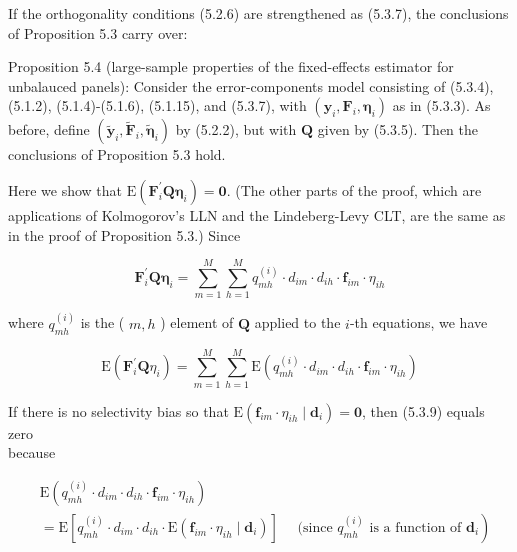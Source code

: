 \documentclass[10pt]{article}
\begin{document}
If the orthogonality conditions (5.2.6) are strengthened as (5.3.7), the conclusions of Proposition 5.3 carry over:

Proposition 5.4 (large-sample properties of the fixed-effects estimator for unbalauced panels): Consider the error-components model consisting of (5.3.4), (5.1.2), (5.1.4)-(5.1.6), (5.1.15), and (5.3.7), with $\left(\mathbf{y}_{i}, \mathbf{F}_{i}, \boldsymbol{\eta}_{i}\right)$ as in (5.3.3). As before, define $\left(\tilde{\mathbf{y}}_{i}, \tilde{\mathbf{F}}_{i}, \tilde{\boldsymbol{\eta}}_{i}\right)$ by (5.2.2), but with $\mathbf{Q}$ given by (5.3.5). Then the conclusions of Proposition 5.3 hold.

Here we show that $\mathrm{E}\left(\mathbf{F}_{i}^{\prime} \mathbf{Q} \boldsymbol{\eta}_{i}\right)=\mathbf{0}$. (The other parts of the proof, which are applications of Kolmogorov's LLN and the Lindeberg-Levy CLT, are the same as in the proof of Proposition 5.3.) Since


\begin{equation*}
\mathbf{F}_{i}^{\prime} \mathbf{Q} \boldsymbol{\eta}_{i}=\sum_{m=1}^{M} \sum_{h=1}^{M} q_{m h}^{(i)} \cdot d_{i m} \cdot d_{i h} \cdot \mathbf{f}_{i m} \cdot \eta_{i h} \tag{5.3.8}
\end{equation*}


where $q_{m h}^{(i)}$ is the ( $m, h$ ) element of $\mathbf{Q}$ applied to the $i$-th equations, we have


\begin{equation*}
\mathrm{E}\left(\mathbf{F}_{i}^{\prime} \mathbf{Q} \eta_{i}\right)=\sum_{m=1}^{M} \sum_{h=1}^{M} \mathrm{E}\left(q_{m h}^{(i)} \cdot d_{i m} \cdot d_{i h} \cdot \mathbf{f}_{i m} \cdot \eta_{i h}\right) \tag{5.3.9}
\end{equation*}


If there is no selectivity bias so that $\mathrm{E}\left(\mathbf{f}_{i m} \cdot \eta_{i h} \mid \mathbf{d}_{i}\right)=\mathbf{0}$, then (5.3.9) equals zero\\
because


\begin{align*}
& \mathrm{E}\left(q_{m h}^{(i)} \cdot d_{i m} \cdot d_{i h} \cdot \mathbf{f}_{i m} \cdot \eta_{i h}\right) \\
& \left.=\mathrm{E}\left[q_{m h}^{(i)} \cdot d_{i m} \cdot d_{i h} \cdot \mathrm{E}\left(\mathbf{f}_{i m} \cdot \eta_{i h} \mid \mathbf{d}_{i}\right)\right] \quad \text { (since } q_{m h}^{(i)} \text { is a function of } \mathbf{d}_{i}\right) \tag{5.3.10}
\end{align*}
\end{document}

